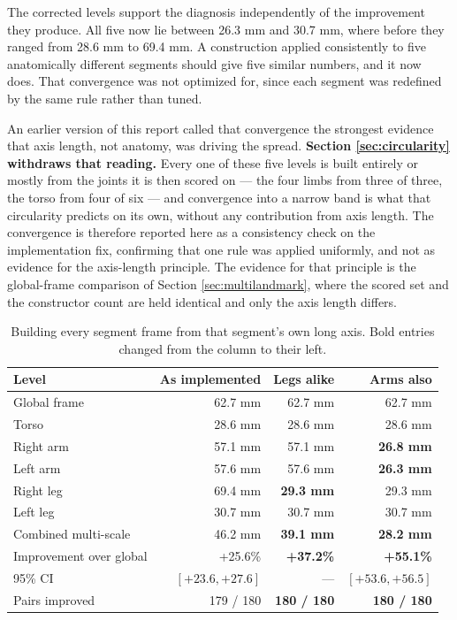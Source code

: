 The corrected levels support the diagnosis independently of the improvement they produce. All five now lie between 26.3 mm and 30.7 mm, where before they ranged from 28.6 mm to 69.4 mm. A construction applied consistently to five anatomically different segments should give five similar numbers, and it now does. That convergence was not optimized for, since each segment was redefined by the same rule rather than tuned.

An earlier version of this report called that convergence the strongest evidence that axis length, not anatomy, was driving the spread. \textbf{Section \ref{sec:circularity} withdraws that reading.} Every one of these five levels is built entirely or mostly from the joints it is then scored on --- the four limbs from three of three, the torso from four of six --- and convergence into a narrow band is what that circularity predicts on its own, without any contribution from axis length. The convergence is therefore reported here as a consistency check on the implementation fix, confirming that one rule was applied uniformly, and not as evidence for the axis-length principle. The evidence for that principle is the global-frame comparison of Section \ref{sec:multilandmark}, where the scored set and the constructor count are held identical and only the axis length differs.

\begin{table}[htbp]
\centering
\caption[Building every segment frame from that segment's own long axis]{Building every segment frame from that segment's own long axis. Bold entries changed from the column to their left.}
\label{tab:msfix}
\begin{tabular}{lrrr}
\hline
\textbf{Level} & \textbf{As implemented} & \textbf{Legs alike} & \textbf{Arms also} \\
\hline
Global frame & 62.7 mm & 62.7 mm & 62.7 mm \\
Torso & 28.6 mm & 28.6 mm & 28.6 mm \\
Right arm & 57.1 mm & 57.1 mm & \textbf{26.8 mm} \\
Left arm & 57.6 mm & 57.6 mm & \textbf{26.3 mm} \\
Right leg & 69.4 mm & \textbf{29.3 mm} & 29.3 mm \\
Left leg & 30.7 mm & 30.7 mm & 30.7 mm \\
\hline
Combined multi-scale & 46.2 mm & \textbf{39.1 mm} & \textbf{28.2 mm} \\
Improvement over global & +25.6\% & \textbf{+37.2\%} & \textbf{+55.1\%} \\
95\% CI & $[+23.6, +27.6]$ & --- & $\mathbf{[+53.6, +56.5]}$ \\
Pairs improved & 179 / 180 & \textbf{180 / 180} & \textbf{180 / 180} \\
\hline
\end{tabular}
\end{table}

